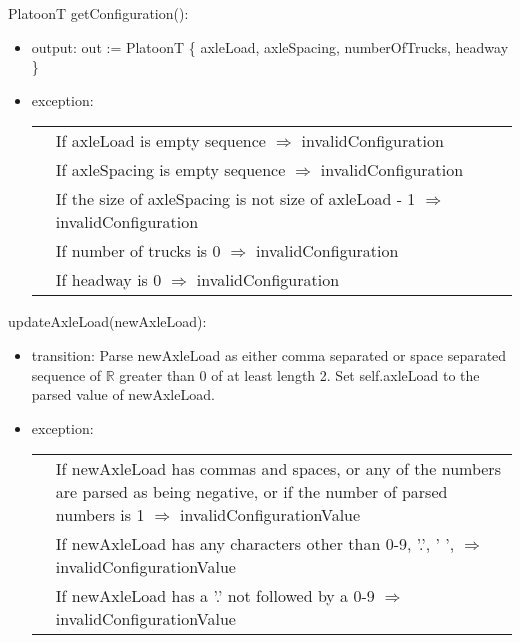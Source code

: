 \documentclass[12pt, titlepage]{article}
\begin{document}
\noindent PlatoonT getConfiguration():
\begin{itemize}
\item output: out := PlatoonT \{ axleLoad, axleSpacing, numberOfTrucks, headway \} 
\item exception:\\
    \begin{tabular}{p{1cm} p{14cm}}
    & If axleLoad is empty sequence $\Rightarrow$ invalidConfiguration \\
    & If axleSpacing is empty sequence $\Rightarrow$ invalidConfiguration \\
    & If the size of axleSpacing is not size of axleLoad - 1 $\Rightarrow$ invalidConfiguration \\
    & If number of trucks is 0 $\Rightarrow$ invalidConfiguration \\
    & If headway is 0 $\Rightarrow$ invalidConfiguration \\
    \end{tabular}
\end{itemize}

\noindent updateAxleLoad(newAxleLoad):
\begin{itemize}
\item transition: Parse newAxleLoad as either comma separated or space separated sequence of $\mathbb{R}$ greater than 0 of at least length 2. Set self.axleLoad to the parsed value of newAxleLoad.
\item exception:\\
  \begin{tabular}{p{1cm} p{16cm}}
    & If newAxleLoad has commas and spaces, or any of the numbers are parsed as being negative, or if the number of parsed numbers is 1 $\Rightarrow$ invalidConfigurationValue \\
    & If newAxleLoad has any characters other than 0-9, '.', ' ', $\Rightarrow$ invalidConfigurationValue \\
    &If newAxleLoad has a '.' not followed by a 0-9 $\Rightarrow$ invalidConfigurationValue \\
\end{tabular}

\end{itemize}
\end{document}
